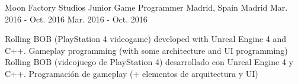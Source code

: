 \begin{cventries}
	\cventry
	{
		Moon Factory Studios
	} %
	{
		Junior Game Programmer
	} %
	{
		{Madrid, Spain}
		{Madrid}
	} %
	{
		{Mar. 2016 - Oct. 2016}
		{Mar. 2016 - Oct. 2016}
	} %
	{
		\begin{cvitems} %
			\item {
				{Rolling BOB (PlayStation 4 videogame) developed with Unreal Engine 4 and C++. Gameplay programming (with some architecture and UI programming)}
				{Rolling BOB (videojuego de PlayStation 4) desarrollado con Unreal Engine 4 y C++. Programación de gameplay (+ elementos de arquitectura y UI)}
			}
		\end{cvitems}
	}
	
	
	
\end{cventries}
